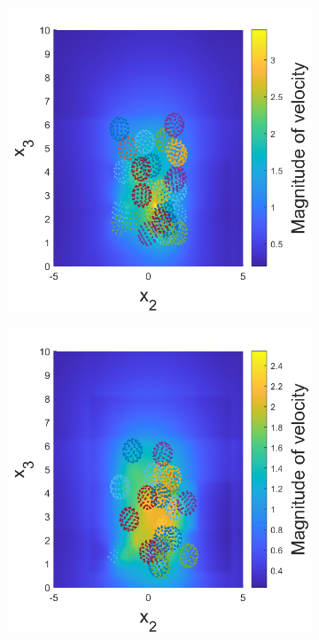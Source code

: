 \begin{figure}
\centering
\begin{subfigure}[b]{0.24\textwidth}
    \centering
    \includegraphics[width=\textwidth]{Images/squirmers/Gyro-1.pdf}
    \caption[]{\label{fig:squirmerA}}
\end{subfigure}
\begin{subfigure}[b]{0.24\textwidth}
    \centering
    \includegraphics[width=\textwidth]{Images/squirmers/Gyro-2.pdf}

\end{subfigure}
\end{figure}
